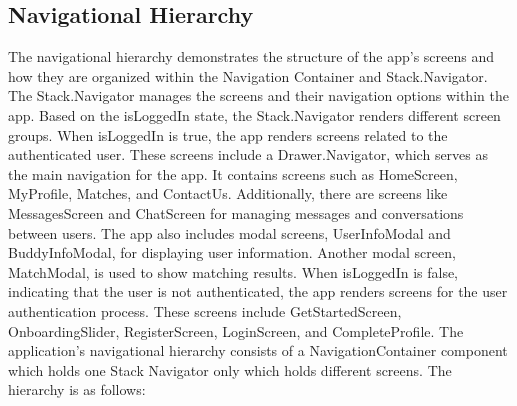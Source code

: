 \subsection{Navigational Hierarchy}\label{subsec:nav_hierarchy}
The navigational hierarchy demonstrates the structure of the app's screens and how they are organized within the Navigation Container and Stack.Navigator. The Stack.Navigator manages the screens and their navigation options within the app.
Based on the isLoggedIn state, the Stack.Navigator renders different screen groups. When isLoggedIn is true, the app renders screens related to the authenticated user. These screens include a Drawer.Navigator, which serves as the main navigation for the app. It contains screens such as HomeScreen, MyProfile, Matches, and ContactUs. Additionally, there are screens like MessagesScreen and ChatScreen for managing messages and conversations between users. The app also includes modal screens, UserInfoModal and BuddyInfoModal, for displaying user information. Another modal screen, MatchModal, is used to show matching results.
When isLoggedIn is false, indicating that the user is not authenticated, the app renders screens for the user authentication process. These screens include GetStartedScreen, OnboardingSlider, RegisterScreen, LoginScreen, and CompleteProfile.\newline
The application's navigational hierarchy consists of a NavigationContainer component which holds one Stack Navigator only which holds different screens. The hierarchy is as follows:
